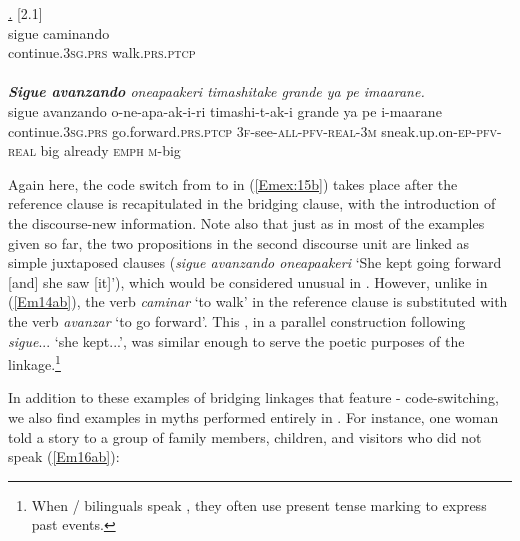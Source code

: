 \documentclass[output=paper]{LSP/langsci}
\begin{document}
\begin{exe}
\ex \label{Em15ab}
\begin{xlist}
\ex \label{Emex:15a}
\glt \textit{\underline{.}} [2.1]\\
\gll sigue caminando\\
 continue\textsc{.3sg.prs} walk\textsc{.prs.ptcp}\\
\glt {}\\
\ex \label{Emex:15b}
\glt \textit{\textbf{Sigue avanzando} oneapaakeri timashitake grande ya pe imaarane.}\\
\gll sigue avanzando o-ne-apa-ak-i-ri timashi-t-ak-i grande ya pe i-maarane\\     	      
    continue\textsc{.3sg.prs} go.forward\textsc{.prs.ptcp} \textsc{3f-}see\textsc{-all-pfv-real-3m} sneak.up.on\textsc{-ep-pfv-real} big already \textsc{emph} \textsc{m-}big\\
\glt {}
\end{xlist}
\end{exe}


Again here, the code switch from  to  in (\ref{Emex:15b}) takes place after the reference clause is recapitulated in the bridging clause, with the introduction of the discourse-new information. Note also that just as in most of the  examples given so far, the two propositions in the second discourse unit are linked as simple juxtaposed clauses (\textit{sigue avanzando oneapaakeri} `She kept going forward [and] she saw [it]'), which would be considered unusual in . However, unlike in (\ref{Em14ab}), the verb \textit{caminar} `to walk' in the reference clause is substituted with the verb \textit{avanzar} `to go forward'. This , in a parallel construction following \textit{sigue}... `she kept...', was similar enough to serve the poetic purposes of the linkage.\footnote{When / bilinguals speak , they often use present tense marking to express past events.}
 
 
In addition to these examples of bridging linkages that feature - code-switching, we also find examples in myths performed entirely in . For instance, one woman told a story to a group of family members, children, and visitors who did not speak  (\ref{Em16ab}):
\end{document}

